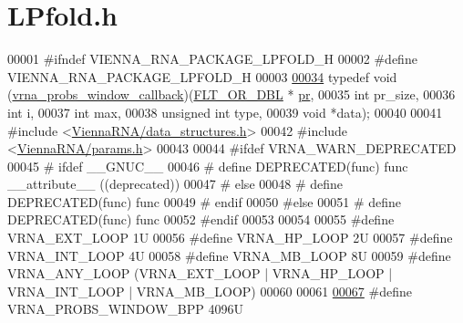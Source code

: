 \hypertarget{LPfold_8h_source}{}\section{L\+Pfold.\+h}
\label{LPfold_8h_source}

\begin{DoxyCode}
00001 \textcolor{preprocessor}{#ifndef VIENNA\_RNA\_PACKAGE\_LPFOLD\_H}
00002 \textcolor{preprocessor}{#define VIENNA\_RNA\_PACKAGE\_LPFOLD\_H}
00003 
\hyperlink{LPfold_8h_abe710a1182e6db69cc75329dfc9bed67}{00034} \textcolor{keyword}{typedef} void (\hyperlink{LPfold_8h_abe710a1182e6db69cc75329dfc9bed67}{vrna\_probs\_window\_callback})(\hyperlink{group__data__structures_ga31125aeace516926bf7f251f759b6126}{FLT\_OR\_DBL}    *
      \hyperlink{fold__vars_8h_ac98ec419070aee6831b44e5c700f090f}{pr},
00035                                           \textcolor{keywordtype}{int}           pr\_size,
00036                                           \textcolor{keywordtype}{int}           i,
00037                                           \textcolor{keywordtype}{int}           max,
00038                                           \textcolor{keywordtype}{unsigned} \textcolor{keywordtype}{int}  type,
00039                                           \textcolor{keywordtype}{void}          *data);
00040 
00041 \textcolor{preprocessor}{#include <\hyperlink{data__structures_8h}{ViennaRNA/data\_structures.h}>}
00042 \textcolor{preprocessor}{#include <\hyperlink{params_8h}{ViennaRNA/params.h}>}
00043 
00044 \textcolor{preprocessor}{#ifdef VRNA\_WARN\_DEPRECATED}
00045 \textcolor{preprocessor}{# ifdef \_\_GNUC\_\_}
00046 \textcolor{preprocessor}{#  define DEPRECATED(func) func \_\_attribute\_\_ ((deprecated))}
00047 \textcolor{preprocessor}{# else}
00048 \textcolor{preprocessor}{#  define DEPRECATED(func) func}
00049 \textcolor{preprocessor}{# endif}
00050 \textcolor{preprocessor}{#else}
00051 \textcolor{preprocessor}{# define DEPRECATED(func) func}
00052 \textcolor{preprocessor}{#endif}
00053 
00054 
00055 \textcolor{preprocessor}{#define VRNA\_EXT\_LOOP   1U}
00056 \textcolor{preprocessor}{#define VRNA\_HP\_LOOP    2U}
00057 \textcolor{preprocessor}{#define VRNA\_INT\_LOOP   4U}
00058 \textcolor{preprocessor}{#define VRNA\_MB\_LOOP    8U}
00059 \textcolor{preprocessor}{#define VRNA\_ANY\_LOOP   (VRNA\_EXT\_LOOP | VRNA\_HP\_LOOP | VRNA\_INT\_LOOP | VRNA\_MB\_LOOP)}
00060 
00061 
\hyperlink{group__local__pf__fold_ga296217b76e76e5f7e6927e7210aa9b1f}{00067} \textcolor{preprocessor}{#define VRNA\_PROBS\_WINDOW\_BPP  4096U}

\end{DoxyCode}
